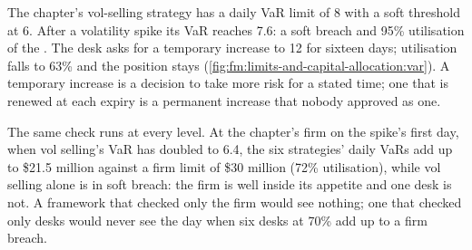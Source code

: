 The chapter's vol-selling strategy has a daily VaR limit of 8 with a soft threshold at 6. After a volatility spike its VaR reaches 7.6: a soft
breach and 95\% utilisation of the . The desk asks for a temporary increase to 12 for sixteen days; utilisation falls to 63\% and the
position stays (\cref{fig:fm:limits-and-capital-allocation:var}). A temporary increase is a decision to take more risk for a stated time; one that
is renewed at each expiry is a permanent increase that nobody approved as one.

\begin{omfigure}

\label{fig:fm:limits-and-capital-allocation:var}
\end{omfigure}

The same check runs at every level. At the chapter's firm on the spike's first day, when vol selling's VaR has doubled to 6.4,
the six strategies' daily VaRs add up to \$21.5 million against
a firm limit of \$30 million (72\% utilisation), while vol selling alone is in soft breach: the firm is well inside its appetite and one desk is
not. A framework that checked only the firm would see nothing; one that checked only desks would never see the day when six desks at 70\%
add up to a firm breach.


